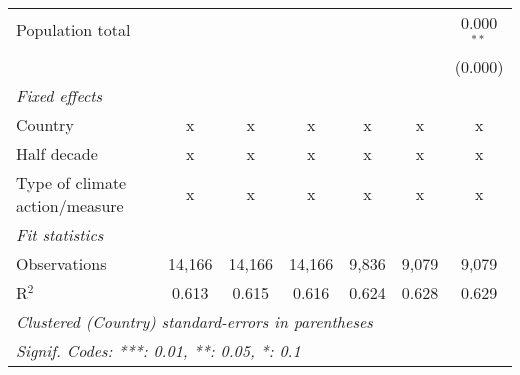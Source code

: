 \begin{tabular}{lcccccc}
   Population total                                                &         &                &                &                &                & 0.000$^{**}$\\   
                                                                   &         &                &                &                &                & (0.000)\\   
   \emph{Fixed effects}\\
   Country                                                         & x       & x              & x              & x              & x              & x\\  
   Half decade                                                     & x       & x              & x              & x              & x              & x\\  
   Type of climate action/measure                                  & x       & x              & x              & x              & x              & x\\  
   \midrule \emph{Fit statistics}\\
   Observations                                                    & 14,166  & 14,166         & 14,166         & 9,836          & 9,079          & 9,079\\  
   R$^2$                                                           & 0.613   & 0.615          & 0.616          & 0.624          & 0.628          & 0.629\\  
   \midrule
   \multicolumn{7}{l}{\emph{Clustered (Country) standard-errors in parentheses}}\\
   \multicolumn{7}{l}{\emph{Signif. Codes: ***: 0.01, **: 0.05, *: 0.1}}\\
\end{tabular}
\par\endgroup


